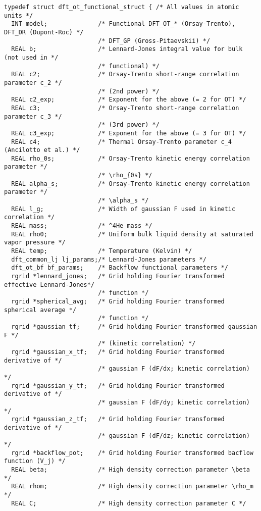 \documentclass[12pt,letterpaper]{report}
\begin{document}
\begin{verbatim}
typedef struct dft_ot_functional_struct { /* All values in atomic units */
  INT model;              /* Functional DFT_OT_* (Orsay-Trento), DFT_DR (Dupont-Roc) */        
                          /* DFT_GP (Gross-Pitaevskii) */
  REAL b;                 /* Lennard-Jones integral value for bulk (not used in */
                          /* functional) */
  REAL c2;                /* Orsay-Trento short-range correlation parameter c_2 */
                          /* (2nd power) */
  REAL c2_exp;            /* Exponent for the above (= 2 for OT) */
  REAL c3;                /* Orsay-Trento short-range correlation parameter c_3 */
                          /* (3rd power) */
  REAL c3_exp;            /* Exponent for the above (= 3 for OT) */
  REAL c4;                /* Thermal Orsay-Trento parameter c_4 (Ancilotto et al.) */
  REAL rho_0s;            /* Orsay-Trento kinetic energy correlation parameter */
                          /* \rho_{0s} */
  REAL alpha_s;           /* Orsay-Trento kinetic energy correlation parameter */
                          /* \alpha_s */
  REAL l_g;               /* Width of gaussian F used in kinetic correlation */
  REAL mass;              /* ^4He mass */
  REAL rho0;              /* Uniform bulk liquid density at saturated vapor pressure */
  REAL temp;              /* Temperature (Kelvin) */
  dft_common_lj lj_params;/* Lennard-Jones parameters */
  dft_ot_bf bf_params;    /* Backflow functional parameters */
  rgrid *lennard_jones;   /* Grid holding Fourier transformed effective Lennard-Jones*/
                          /* function */
  rgrid *spherical_avg;   /* Grid holding Fourier transformed spherical average */
                          /* function */
  rgrid *gaussian_tf;     /* Grid holding Fourier transformed gaussian F */
                          /* (kinetic correlation) */ 
  rgrid *gaussian_x_tf;   /* Grid holding Fourier transformed derivative of */
                          /* gaussian F (dF/dx; kinetic correlation) */ 
  rgrid *gaussian_y_tf;   /* Grid holding Fourier transformed derivative of */
                          /* gaussian F (dF/dy; kinetic correlation) */ 
  rgrid *gaussian_z_tf;   /* Grid holding Fourier transformed derivative of */
                          /* gaussian F (dF/dz; kinetic correlation) */ 
  rgrid *backflow_pot;    /* Grid holding Fourier transformed bacflow function (V_j) */
  REAL beta;              /* High density correction parameter \beta */
  REAL rhom;              /* High density correction parameter \rho_m */
  REAL C;                 /* High density correction parameter C */

\end{verbatim}
\end{document}
